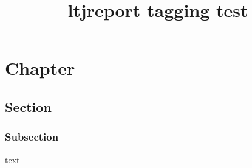\documentclass{ltjreport}
\title{ltjreport tagging test}
\begin{document}
\tableofcontents

\chapter{Chapter} %
\section{Section}
\subsection{Subsection}
text
\end{document}
